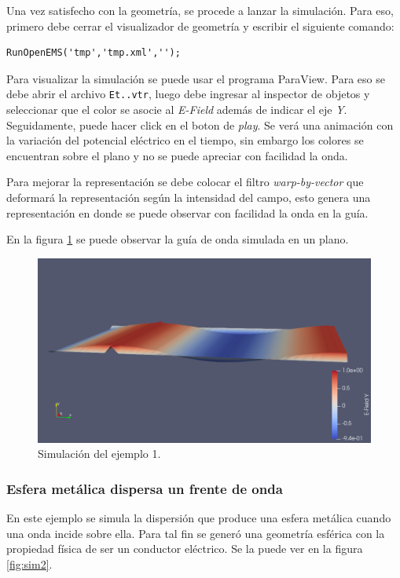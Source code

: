 \documentclass[
    11pt,
    spanish,
    a4paper
]{article}
\begin{document}
Una vez satisfecho con la geometría, se procede a lanzar la simulación. Para
eso, primero debe cerrar el visualizador de geometría y escribir el siguiente
comando:

\begin{verbatim}
RunOpenEMS('tmp','tmp.xml','');
\end{verbatim}

Para visualizar la simulación se puede usar el programa ParaView. Para eso se
debe abrir el archivo \texttt{Et..vtr}, luego debe ingresar al inspector de
objetos y seleccionar que el color se asocie al \emph{E-Field} además de indicar
el eje \emph{Y}. Seguidamente,
puede hacer click en el boton de \emph{play}.
Se verá una animación con la variación del potencial eléctrico en el tiempo, sin
embargo los colores se encuentran sobre el plano y no se puede apreciar con
facilidad la onda.

Para mejorar la representación se debe colocar el filtro \emph{warp-by-vector}
que deformará la representación según la intensidad del campo, esto genera una
representación en donde se puede observar con facilidad la onda en la guía.

En la figura \ref{fig:sim1} se puede observar la guía de onda simulada en un plano.

\begin{figure}[htbp]
	\centering
	\includegraphics[width=\textwidth]{./img/sim1.png}
	\caption{Simulación del ejemplo 1.}
	\label{fig:sim1}
\end{figure}

\subsubsection{Esfera metálica dispersa un frente de onda}
\label{subsub:oejemplo2}

En este ejemplo se simula la dispersión que produce una esfera metálica cuando
una onda incide sobre ella.
Para tal fin se generó una geometría esférica con la propiedad física de ser un
conductor eléctrico. Se la puede ver en la figura \ref{fig:sim2}.
\end{document}
